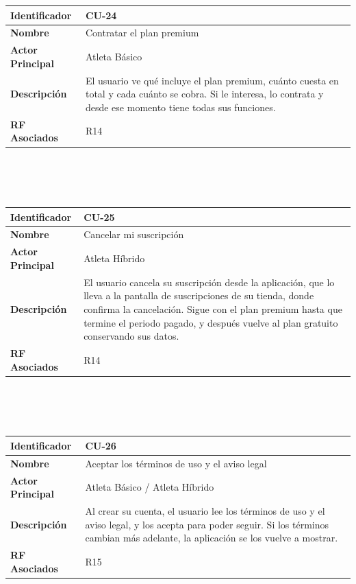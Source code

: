 \newpage
\begin{tabular}{|p{3.5cm}|p{11.5cm}|}
    \hline
    \rowcolor[HTML]{EFEFEF}
    \textbf{Identificador} & \textbf{CU-24} \\ \hline
    \textbf{Nombre} & Contratar el plan premium \\ \hline
    \textbf{Actor Principal} & Atleta Básico \\ \hline
    \textbf{Descripción} & El usuario ve qué incluye el plan premium, cuánto cuesta en total y cada cuánto se cobra. Si le interesa, lo contrata y desde ese momento tiene todas sus funciones. \\ \hline
    \textbf{RF Asociados} & R14 \\ \hline
\end{tabular}
\\\\\\
\begin{tabular}{|p{3.5cm}|p{11.5cm}|}
    \hline
    \rowcolor[HTML]{EFEFEF}
    \textbf{Identificador} & \textbf{CU-25} \\ \hline
    \textbf{Nombre} & Cancelar mi suscripción \\ \hline
    \textbf{Actor Principal} & Atleta Híbrido \\ \hline
    \textbf{Descripción} & El usuario cancela su suscripción desde la aplicación, que lo lleva a la pantalla de suscripciones de su tienda, donde confirma la cancelación. Sigue con el plan premium hasta que termine el periodo pagado, y después vuelve al plan gratuito conservando sus datos. \\ \hline
    \textbf{RF Asociados} & R14 \\ \hline
\end{tabular}
\\\\\\
\begin{tabular}{|p{3.5cm}|p{11.5cm}|}
    \hline
    \rowcolor[HTML]{EFEFEF}
    \textbf{Identificador} & \textbf{CU-26} \\ \hline
    \textbf{Nombre} & Aceptar los términos de uso y el aviso legal \\ \hline
    \textbf{Actor Principal} & Atleta Básico / Atleta Híbrido \\ \hline
    \textbf{Descripción} & Al crear su cuenta, el usuario lee los términos de uso y el aviso legal, y los acepta para poder seguir. Si los términos cambian más adelante, la aplicación se los vuelve a mostrar. \\ \hline
    \textbf{RF Asociados} & R15 \\ \hline
\end{tabular}
